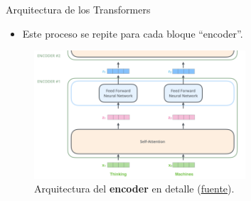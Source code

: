 \begin{frame}{Arquitectura de los Transformers}
\begin{itemize}
    \item Este proceso se repite para cada bloque “encoder”.
\end{itemize}

\begin{figure}
    \centering
    \includegraphics[width=0.7\textwidth]{Slides/figures/02_Metodos_Generativos/trans-arch8.png}
    \caption{Arquitectura del \textbf{encoder} en detalle (\href{http://jalammar.github.io/illustrated-transformer/}{fuente}).}
\end{figure}
\end{frame}

